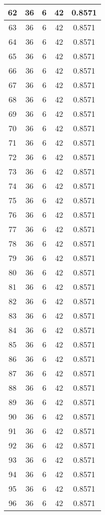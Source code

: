 \documentclass[letterpaper, 12pt]{article}
\begin{document}
\begin{longtable}{|c|c|c|c|c|}
\hline
62 & 36 & 6 & 42 & 0.8571 \\
\hline
63 & 36 & 6 & 42 & 0.8571 \\
\hline
64 & 36 & 6 & 42 & 0.8571 \\
\hline
65 & 36 & 6 & 42 & 0.8571 \\
\hline
66 & 36 & 6 & 42 & 0.8571 \\
\hline
67 & 36 & 6 & 42 & 0.8571 \\
\hline
68 & 36 & 6 & 42 & 0.8571 \\
\hline
69 & 36 & 6 & 42 & 0.8571 \\
\hline
70 & 36 & 6 & 42 & 0.8571 \\
\hline
71 & 36 & 6 & 42 & 0.8571 \\
\hline
72 & 36 & 6 & 42 & 0.8571 \\
\hline
73 & 36 & 6 & 42 & 0.8571 \\
\hline
74 & 36 & 6 & 42 & 0.8571 \\
\hline
75 & 36 & 6 & 42 & 0.8571 \\
\hline
76 & 36 & 6 & 42 & 0.8571 \\
\hline
77 & 36 & 6 & 42 & 0.8571 \\
\hline
78 & 36 & 6 & 42 & 0.8571 \\
\hline
79 & 36 & 6 & 42 & 0.8571 \\
\hline
80 & 36 & 6 & 42 & 0.8571 \\
\hline
81 & 36 & 6 & 42 & 0.8571 \\
\hline
82 & 36 & 6 & 42 & 0.8571 \\
\hline
83 & 36 & 6 & 42 & 0.8571 \\
\hline
84 & 36 & 6 & 42 & 0.8571 \\
\hline
85 & 36 & 6 & 42 & 0.8571 \\
\hline
86 & 36 & 6 & 42 & 0.8571 \\
\hline
87 & 36 & 6 & 42 & 0.8571 \\
\hline
88 & 36 & 6 & 42 & 0.8571 \\
\hline
89 & 36 & 6 & 42 & 0.8571 \\
\hline
90 & 36 & 6 & 42 & 0.8571 \\
\hline
91 & 36 & 6 & 42 & 0.8571 \\
\hline
92 & 36 & 6 & 42 & 0.8571 \\
\hline
93 & 36 & 6 & 42 & 0.8571 \\
\hline
94 & 36 & 6 & 42 & 0.8571 \\
\hline
95 & 36 & 6 & 42 & 0.8571 \\
\hline
96 & 36 & 6 & 42 & 0.8571 \\

\end{longtable}
\end{document}
